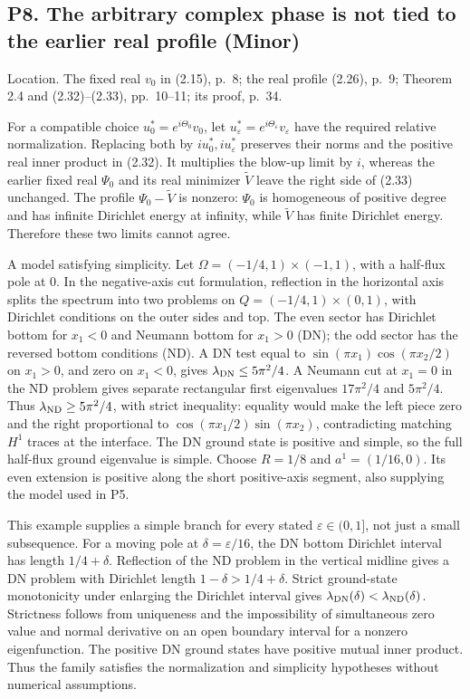 \documentclass[10pt]{article}
\begin{document}
\subsection*{P8. The arbitrary complex phase is not tied to the earlier real profile (Minor)}
Location. The fixed real \(v_0\) in (2.15), p. 8; the real profile (2.26), p. 9; Theorem 2.4 and (2.32)–(2.33), pp. 10–11; its proof, p. 34.\par
For a compatible choice \(u_0^*=e^{i\Theta_0}v_0\), let \(u_\varepsilon^*=e^{i\Theta_\varepsilon}v_\varepsilon\) have the required relative normalization. Replacing both by \(iu_0^*,iu_\varepsilon^*\) preserves their norms and the positive real inner product in (2.32). It multiplies the blow-up limit by \(i\), whereas the earlier fixed real \(\Psi_0\) and its real minimizer \(\widetilde V\) leave the right side of (2.33) unchanged. The profile \(\Psi_0-\widetilde V\) is nonzero: \(\Psi_0\) is homogeneous of positive degree and has infinite Dirichlet energy at infinity, while \(\widetilde V\) has finite Dirichlet energy. Therefore these two limits cannot agree.\par
A model satisfying simplicity. Let \(\Omega=(-1/4,1)\times(-1,1)\), with a half-flux pole at \(0\). In the negative-axis cut formulation, reflection in the horizontal axis splits the spectrum into two problems on \(Q=(-1/4,1)\times(0,1)\), with Dirichlet conditions on the outer sides and top. The even sector has Dirichlet bottom for \(x_1<0\) and Neumann bottom for \(x_1>0\) (DN); the odd sector has the reversed bottom conditions (ND). A DN test equal to \(\sin(\pi x_1)\cos(\pi x_2/2)\) on \(x_1>0\), and zero on \(x_1<0\), gives \(\lambda_{\rm DN}\le5\pi^2/4\). A Neumann cut at \(x_1=0\) in the ND problem gives separate rectangular first eigenvalues \(17\pi^2/4\) and \(5\pi^2/4\). Thus \(\lambda_{\rm ND}\ge5\pi^2/4\), with strict inequality: equality would make the left piece zero and the right proportional to \(\cos(\pi x_1/2)\sin(\pi x_2)\), contradicting matching \(H^1\) traces at the interface. The DN ground state is positive and simple, so the full half-flux ground eigenvalue is simple. Choose \(R=1/8\) and \(a^1=(1/16,0)\). Its even extension is positive along the short positive-axis segment, also supplying the model used in P5.\par
This example supplies a simple branch for every stated \(\varepsilon\in(0,1]\), not just a small subsequence. For a moving pole at \(\delta=\varepsilon/16\), the DN bottom Dirichlet interval has length \(1/4+\delta\). Reflection of the ND problem in the vertical midline gives a DN problem with Dirichlet length \(1-\delta>1/4+\delta\). Strict ground-state monotonicity under enlarging the Dirichlet interval gives \(\lambda_{\rm DN}(\delta)<\lambda_{\rm ND}(\delta)\). Strictness follows from uniqueness and the impossibility of simultaneous zero value and normal derivative on an open boundary interval for a nonzero eigenfunction. The positive DN ground states have positive mutual inner product. Thus the family satisfies the normalization and simplicity hypotheses without numerical assumptions.\par
\end{document}
